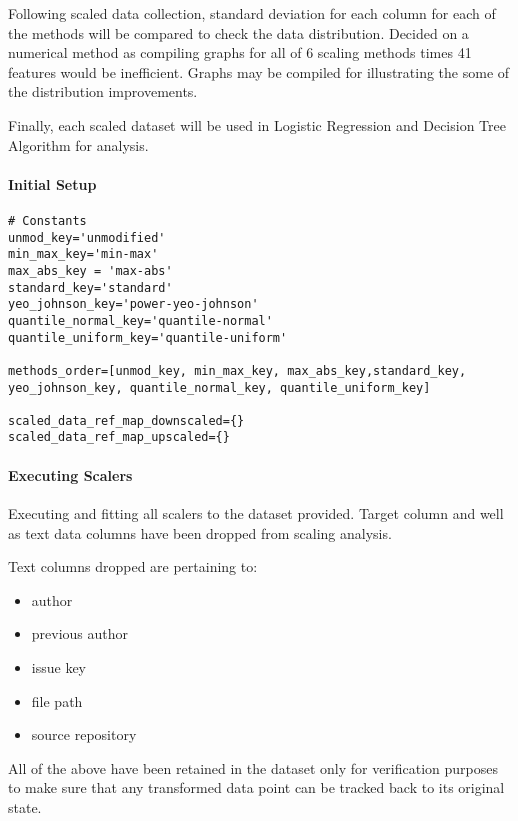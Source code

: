 Following scaled data collection, standard deviation for each column for each of the methods will be compared to check the data distribution. Decided on a numerical method as compiling graphs for all of 6 scaling methods times 41 features would be inefficient. Graphs may be compiled for illustrating the some of the distribution improvements.

Finally, each scaled dataset will be used in Logistic Regression and Decision Tree Algorithm for analysis.
\paragraph{Initial Setup}
\begin{code}
\label{code:scalers:setup}
\begin{verbatim}
# Constants
unmod_key='unmodified'
min_max_key='min-max'
max_abs_key = 'max-abs'
standard_key='standard'
yeo_johnson_key='power-yeo-johnson'
quantile_normal_key='quantile-normal'
quantile_uniform_key='quantile-uniform'

methods_order=[unmod_key, min_max_key, max_abs_key,standard_key, yeo_johnson_key, quantile_normal_key, quantile_uniform_key]

scaled_data_ref_map_downscaled={}
scaled_data_ref_map_upscaled={}
\end{verbatim}
\end{code}
\paragraph{Executing Scalers}
Executing and fitting all scalers to the dataset provided. Target column and well as text data columns have been dropped from scaling analysis.

Text columns dropped are pertaining to:
\begin{itemize}
    \item author
    \item previous author
    \item issue key
    \item file path
    \item source repository
\end{itemize}

All of the above have been retained in the dataset only for verification purposes to make sure that any transformed data point can be tracked back to its original state.

